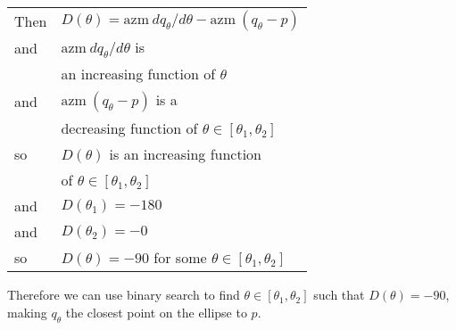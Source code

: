 \documentclass[12pt]{article}
\begin{document}
\begin{minipage}{\textwidth}
\begin{tabular}{@{}ll}
Then	& $D(\theta) = \mathrm{azm}~dq_\theta/d\theta
		     - \mathrm{azm}~(q_\theta-p)$ \\
and	& $\mathrm{azm}~dq_\theta/d\theta$ is \\
        & an increasing function of $\theta$ \\
and	& $\mathrm{azm}~(q_\theta-p)$ is a \\
        & decreasing function of
          $\theta \in [\theta_1,\theta_2]$ \\
so	& $D(\theta)$ is an increasing function \\
        & of $\theta \in [\theta_1,\theta_2]$ \\
and	& $D(\theta_1) = -180$ \\
and	& $D(\theta_2) = -0$ \\
so	& $D(\theta) = -90$ for some
          $\theta \in [\theta_1,\theta_2]$ \\
\end{tabular}
\end{minipage}

Therefore we can use binary search to find
$\theta \in [\theta_1,\theta_2]$ such that
$D(\theta) = -90$, making $q_\theta$ the closest
point on the ellipse to $p$.
\end{document}
